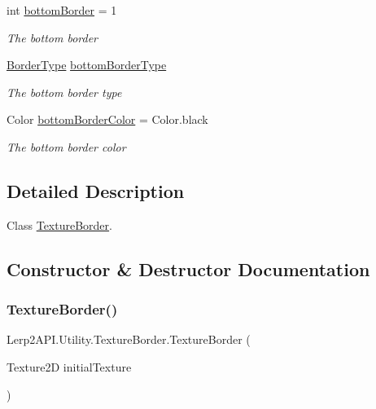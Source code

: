 \begin{DoxyCompactItemize}
int \hyperlink{class_lerp2_a_p_i_1_1_utility_1_1_texture_border_a7f1cc8ce39a81b8a6cb223932ffe7fc1}{bottom\+Border} = 1
\begin{DoxyCompactList}\small\item\em The bottom border \end{DoxyCompactList}\item 
\hyperlink{namespace_lerp2_a_p_i_1_1_utility_a8046e09472382edc5b740291a380c94c}{Border\+Type} \hyperlink{class_lerp2_a_p_i_1_1_utility_1_1_texture_border_a4bc5c94aa9bdcdcc50cecec089383275}{bottom\+Border\+Type}
\begin{DoxyCompactList}\small\item\em The bottom border type \end{DoxyCompactList}\item 
Color \hyperlink{class_lerp2_a_p_i_1_1_utility_1_1_texture_border_a447e083ab13afe805e4a6511c7e1186d}{bottom\+Border\+Color} = Color.\+black
\begin{DoxyCompactList}\small\item\em The bottom border color \end{DoxyCompactList}\end{DoxyCompactItemize}


\subsection{Detailed Description}
Class \hyperlink{class_lerp2_a_p_i_1_1_utility_1_1_texture_border}{Texture\+Border}. 



\subsection{Constructor \& Destructor Documentation}
\mbox{\label{class_lerp2_a_p_i_1_1_utility_1_1_texture_border_a6027a401443b51f04e868ecf2ec47665}} 
\subsubsection{\texorpdfstring{Texture\+Border()}{TextureBorder()}}
{\footnotesize\ttfamily Lerp2\+A\+P\+I.\+Utility.\+Texture\+Border.\+Texture\+Border (\begin{DoxyParamCaption}\item[{Texture2D}]{initial\+Texture }\end{DoxyParamCaption})\hspace{0.3cm}{\ttfamily [inline]}}



